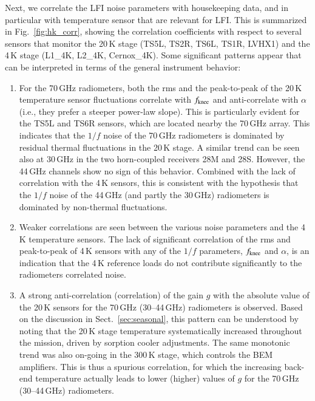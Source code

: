 \documentclass[twocolumn]{aa}
\begin{document}
Next, we correlate the LFI noise parameters with housekeeping data, and
in particular with temperature sensor that are relevant for LFI. This
is summarized in Fig.~\ref{fig:hk_corr}, showing the correlation
coefficients with respect to several sensors that monitor the 20\,K
stage (TS5L, TS2R, TS6L, TS1R, LVHX1) and the 4\,K stage (L1\_4K,
L2\_4K, Cernox\_4K).
Some significant patterns appear that can be interpreted in terms of
the general instrument behavior:
\begin{enumerate}
	\item
	For the 70\,GHz radiometers, both the rms and the peak-to-peak
        of the 20\,K temperature sensor fluctuations 
        correlate with $f_{\rm knee}$ and anti-correlate with $\alpha$
        (i.e., they prefer a steeper power-law slope). This is
        particularly evident for the TS5L and TS6R sensors, which are
        located nearby the 70\,GHz array. This indicates that the $1/f$
        noise of the 70\,GHz radiometers is dominated by residual
        thermal fluctuations in the 20\,K stage. A similar trend can
        be seen also at 30\,GHz in the two horn-coupled receivers 28M
        and 28S. However, the 44\,GHz channels show no
        sign of this behavior. 
        Combined with the lack of correlation with the 4\,K
        sensors, this is consistent with the hypothesis that the $1/f$ noise
        of the 44\,GHz (and partly the 30\,GHz) radiometers is dominated by
        non-thermal fluctuations.
	\item
	Weaker correlations are seen between the various noise parameters and the
        4\,K temperature sensors. The lack of significant correlation of the rms and peak-to-peak of 4\,K sensors with any of the $1/f$ parameters, $f_{\rm knee}$ and  $\alpha$, is an indication that the 4\,K reference loads do not contribute significantly to the radiometers correlated noise.
	\item
	A strong anti-correlation (correlation) of the gain $g$ with
        the absolute value of the 20\,K sensors for the 70\,GHz
        (30--44\,GHz) radiometers is observed. Based on the discussion
        in Sect.~\ref{sec:seasonal}, this pattern can be understood by
        noting that the 20\,K stage temperature systematically
        increased throughout the mission, driven by sorption cooler
        adjustments. The same monotonic trend was also on-going in the
        300\,K stage, which controls the BEM amplifiers. This is thus a
        spurious correlation, for which the increasing back-end
        temperature actually leads to lower (higher) values of $g$ for
        the 70\,GHz (30--44\,GHz) radiometers.
\end{enumerate}
\end{document}

